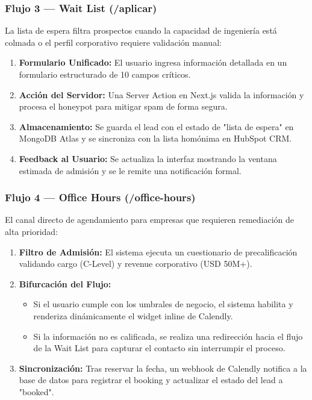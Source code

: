 \documentclass[11pt,letterpaper]{article}
\begin{document}
\subsubsection{Flujo 3 — Wait List (/aplicar)}
La lista de espera filtra prospectos cuando la capacidad de ingeniería está colmada o el perfil corporativo requiere validación manual:
\begin{enumerate}
\item \textbf{Formulario Unificado:} El usuario ingresa información detallada en un formulario estructurado de 10 campos críticos.
\item \textbf{Acción del Servidor:} Una Server Action en Next.js valida la información y procesa el honeypot para mitigar spam de forma segura.
\item \textbf{Almacenamiento:} Se guarda el lead con el estado de "lista de espera" en MongoDB Atlas y se sincroniza con la lista homónima en HubSpot CRM.
\item \textbf{Feedback al Usuario:} Se actualiza la interfaz mostrando la ventana estimada de admisión y se le remite una notificación formal.
\end{enumerate}

\subsubsection{Flujo 4 — Office Hours (/office-hours)}
El canal directo de agendamiento para empresas que requieren remediación de alta prioridad:
\begin{enumerate}
\item \textbf{Filtro de Admisión:} El sistema ejecuta un cuestionario de precalificación validando cargo (C-Level) y revenue corporativo (USD 50M+).
\item \textbf{Bifurcación del Flujo:} 
  \begin{itemize}
  \item Si el usuario cumple con los umbrales de negocio, el sistema habilita y renderiza dinámicamente el widget inline de Calendly.
  \item Si la información no es calificada, se realiza una redirección hacia el flujo de la Wait List para capturar el contacto sin interrumpir el proceso.
  \end{itemize}
\item \textbf{Sincronización:} Tras reservar la fecha, un webhook de Calendly notifica a la base de datos para registrar el booking y actualizar el estado del lead a "booked".
\end{enumerate}
\end{document}
